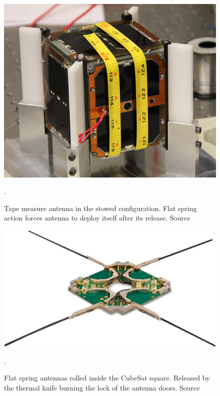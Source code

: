 \begin{figure}[H]
    \centering
    \includegraphics[width=0.5\paperwidth]{img/4/m-cubed.jpg}
    \caption{Tape measure antenna in the stowed configuration. Flat spring action forces antenna to deploy itself after its release. Source \cite{m_cubed}}.
    \label{m_cubed}
\end{figure}

\begin{figure}[H]
    \centering
    \includegraphics[width=0.5\paperwidth]{img/4/isis_dipole.png}
    \caption{Flat spring antennas rolled inside the CubeSat square. Released by the thermal knife burning the lock of the antenna doors. Source \cite{isis_dipole_antenna}}.
    \label{isis_dipole_antenna}
\end{figure}

